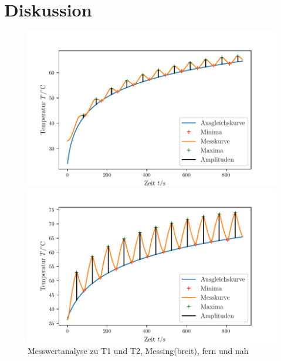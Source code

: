 \section{Diskussion}
\label{sec:Diskussion}
\begin{figure}
    \centering
    \begin{minipage}{.5\textwidth}
        \centering
        \includegraphics[max width=1.1\linewidth]{plots/amplitudes_brass_wide_far(t1).pdf}
        \caption{}
        \label{fig:plot_amps_t1}
    \end{minipage}%
    \begin{minipage}{.5\textwidth}
        \centering
        \includegraphics[max width=1.1\linewidth]{plots/amplitudes_brass_wide_close(t2).pdf}
        \caption{}
        \label{fig:plot_amps_t2}
    \end{minipage}
    \caption{Messwertanalyse zu T1 und T2, Messing(breit), fern und nah}
    \label{fig:plots_amps_t1_t2}
\end{figure}

